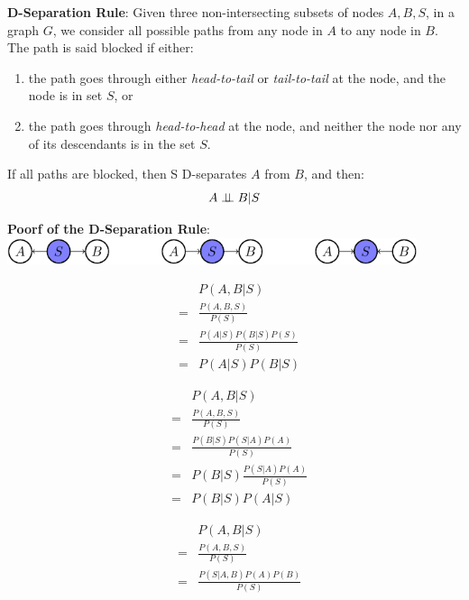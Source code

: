 \begin{theorem}
\textbf{D-Separation Rule}:
 Given three non-intersecting subsets of nodes $A,B,S$, in a graph $G$, we consider all possible paths from any node in $A$ to any node in $B$. The path 
is said blocked if either: 
\begin{enumerate}
 \item the path goes through either \emph{head-to-tail} or \emph{tail-to-tail} at the node, and the node is in set $S$, or
 \item the path goes through \emph{head-to-head} at the node, and neither the node nor any of its descendants is in the set $S$. 
\end{enumerate}
If all paths are blocked, then S D-separates $A$ from $B$, and then:
\begin{equation*}
 A\perp\!\!\!\perp B|S
\end{equation*}
\end{theorem}

\textbf{Poorf of the D-Separation Rule}:\\
\includegraphics[width=0.9\textwidth]{./Figures/D_Sep}\newline
\begin{minipage}[c]{0.3\textwidth}
 \begin{equation*}
  \begin{array}{rcl}
   & & P(A,B|S)\\
   &=& \frac{P(A,B,S)}{P(S)}\\
   &=& \frac{P(A|S)P(B|S)P(S)}{P(S)}\\
   &=& P(A|S)P(B|S)
  \end{array}
 \end{equation*}
\end{minipage}
\begin{minipage}[c]{0.3\textwidth}
 \begin{equation*}
  \begin{array}{rcl}
   & & P(A,B|S)\\
   &=& \frac{P(A,B,S)}{P(S)}\\
   &=& \frac{P(B|S)P(S|A)P(A)}{P(S)}\\
   &=& P(B|S)\frac{P(S|A)P(A)}{P(S)}\\
   &=& P(B|S)P(A|S)
  \end{array}
 \end{equation*}
\end{minipage}
\begin{minipage}[c]{0.3\textwidth}
 \begin{equation*}
  \begin{array}{rcl}
   & & P(A,B|S)\\
   &=& \frac{P(A,B,S)}{P(S)}\\
   &=& \frac{P(S|A,B)P(A)P(B)}{P(S)}\\
  \end{array}
 \end{equation*}
\end{minipage}\\

